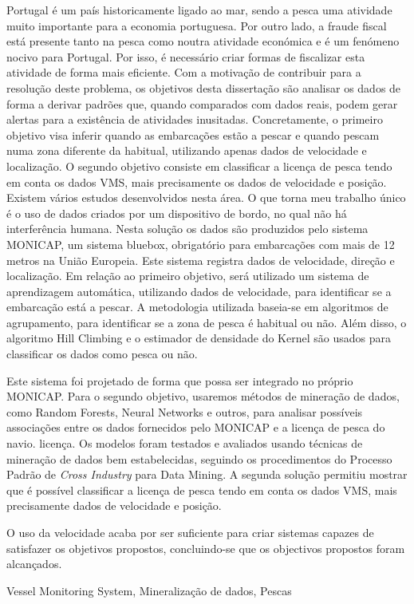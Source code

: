 \abstractPT  %

Portugal é um país historicamente ligado ao mar, sendo a pesca uma atividade muito importante para a economia portuguesa. Por outro lado, a fraude fiscal está presente tanto na pesca como noutra atividade económica e é um fenómeno nocivo para Portugal. Por isso, é necessário criar formas de fiscalizar esta atividade de forma mais eficiente.
Com a motivação de contribuir para a resolução deste problema, os objetivos desta dissertação são analisar os dados de forma a derivar padrões que, quando comparados com dados reais, podem gerar alertas para a existência de atividades inusitadas. Concretamente, o primeiro objetivo visa inferir quando as embarcações estão a pescar e quando pescam numa zona diferente da habitual, utilizando apenas dados de velocidade e localização. O segundo objetivo consiste em classificar a licença de pesca tendo em conta os dados VMS, mais precisamente os dados de velocidade e posição.
Existem vários estudos desenvolvidos nesta área. O que torna meu trabalho único é o uso de dados criados por um dispositivo de bordo, no qual não há interferência humana.
Nesta solução os dados são produzidos pelo sistema MONICAP, um sistema bluebox, obrigatório para embarcações com mais de 12 metros na União Europeia. Este sistema registra dados de velocidade, direção e localização.
Em relação ao primeiro objetivo, será utilizado um sistema de aprendizagem automática, utilizando dados de velocidade, para identificar se a embarcação está a pescar. A metodologia utilizada baseia-se em algoritmos de agrupamento, para identificar se a zona de pesca é habitual ou não. Além disso, o algoritmo Hill Climbing e o estimador de densidade do Kernel são usados para classificar os dados como pesca ou não.

Este sistema foi projetado de forma que possa ser integrado no próprio MONICAP. Para o segundo objetivo, usaremos métodos de mineração de dados, como Random Forests, Neural Networks e outros, para analisar possíveis associações entre os dados fornecidos pelo MONICAP e a licença de pesca do navio.
licença.
Os modelos foram testados e avaliados usando técnicas de mineração de dados bem estabelecidas, seguindo os procedimentos do Processo Padrão de \textit{Cross Industry} para Data Mining.
A segunda solução permitiu mostrar que é possível classificar a licença de pesca tendo em conta os dados VMS, mais precisamente dados de velocidade e posição.

O uso da velocidade acaba por ser suficiente para criar sistemas capazes de satisfazer os objetivos propostos, concluindo-se que os objectivos propostos foram alcançados.

\begin{keywords}
Vessel Monitoring System, Mineralização de dados, Pescas
\end{keywords}
